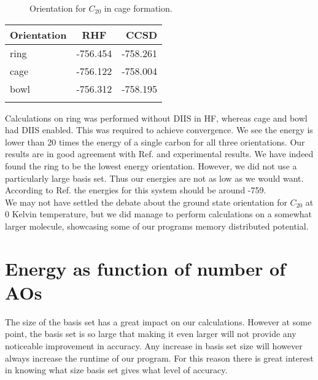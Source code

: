 \begin{figure}[h!]
\begin{center}
\caption{Orientation for $C_{20}$ in cage formation.}
\label{fig:c20cage}
\end{center}
\end{figure}

\begin{center}
\begin{tabular}{ l c r }
	\hline
  	Orientation & RHF & CCSD \\ \hline
  	ring & -756.454 & -758.261  \\ \hline
  	cage & -756.122 & -758.004  \\ \hline
  	bowl & -756.312 & -758.195  \\ \hline
  	\\
	\end{tabular}
\end{center}

Calculations on ring was performed without DIIS in HF, whereas cage and bowl had DIIS enabled. This was required to achieve convergence. We see the energy is lower than 20 times the energy of a single carbon for all three orientations. Our results are in good agreement with Ref.\cite{c20coordinatesarticlezz10} and experimental results. We have indeed found the ring to be the lowest energy orientation. However, we did not use a particularly large basis set. Thus our energies are not as low as we would want. According to Ref.\cite{c20article_cite_this} the energies for this system should be around -759. \\

We may not have settled the debate about the ground state orientation for $C_{20}$ at 0 Kelvin temperature, but we did manage to perform calculations on a somewhat larger molecule, showcasing some of our programs memory distributed potential. 

\section{Energy as function of number of AOs}
The size of the basis set has a great impact on our calculations. However at some point, the basis set is so large that making it even larger will not provide any noticeable improvement in accuracy. Any increase in basis set size will however always increase the runtime of our program. For this reason there is great interest in knowing what size basis set gives what level of accuracy. \\

